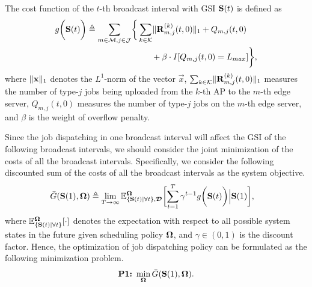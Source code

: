 \begin{definition}
    The cost function of the $t$-th broadcast interval with GSI $\mathbf{S}(t)$ is defined as
    {\small
    \begin{align}
        g\Paren{\Stat(t)} \define
            \sum_{m\in\esSet,j\in\jSpace}
            \Brace{&
                \sum_{k\in\apSet} \Inorm{\vec{R}^{(k)}_{m,j}(t,0)} + Q_{m,j}(t,0)
                \nonumber\\
                &~~~~~+ \beta \cdot I[Q_{m,j}(t,0)=L_{max}]
            },
    \end{align}
    }%
    where $\lVert\mathbf{x}\|_1$ denotes the $L^1$-norm of the vector $\vec{x}$, $\sum_{k\in\mathcal{K}} \lVert\mathbf{R}^{(k)}_{m,j}(t,0)\|_1$ measures the number of type-$j$ jobs being uploaded from the $k$-th AP to the $m$-th edge server, $Q_{m,j}(t,0)$ measures the number of type-$j$ jobs on the $m$-th edge server, and $\beta$ is the weight of overflow penalty.
\end{definition}

Since the job dispatching in one broadcast interval will affect the GSI of the following broadcast intervals, we should consider the joint minimization of the costs of all the broadcast intervals.
Specifically, we consider the following discounted sum of the costs of all the broadcast intervals as the system objective.
{\small
\begin{align}
    &\bar{G}(\Stat(1), \Policy) \define
    \lim_{T \to \infty} \mathbb{E}^{\Policy}_{\set{\Stat(t)|\forall t}, \Delay}
    \Bracket{
        \sum_{t=1}^{T} \gamma^{t-1} g\Paren{\Stat(t)} \Big| \Stat(1)
    },
\end{align}
}%
where $\mathbb{E}^{\boldsymbol{\Omega}}_{\{\mathbf{S}(t)|\forall t\}}[\cdot]$ denotes the expectation with respect to all possible system states in the future given scheduling policy $\boldsymbol{\Omega}$, and $\gamma \in (0,1)$ is the discount factor.
Hence, the optimization of job dispatching policy can be formulated as the following minimization problem.
\begin{align}
    \textbf{P1:}~
    \min_{\boldsymbol{\Omega}} \bar{G}(\mathbf{S}(1), \boldsymbol{\Omega}).
\end{align}

